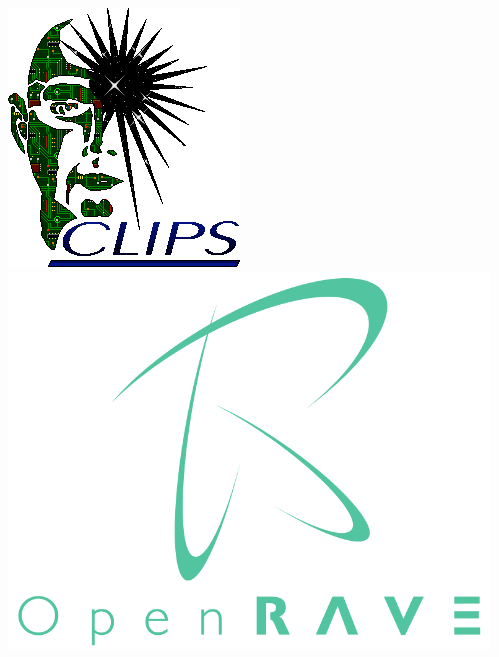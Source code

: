 \begin{frame}
\begin{columns}
\begin{column}{0.83\linewidth}
\begin{description}[]
  \end{description}
  \end{column}
  \begin{column}{0.17\linewidth}
  \includegraphics[width=\textwidth]{../thesis/img/CLIPS}
  \vspace{3.4cm}
  \pause\pause
  \includegraphics[width=\textwidth]{../thesis/img/openrave}
  \end{column}
  \end{columns}
\end{frame}

